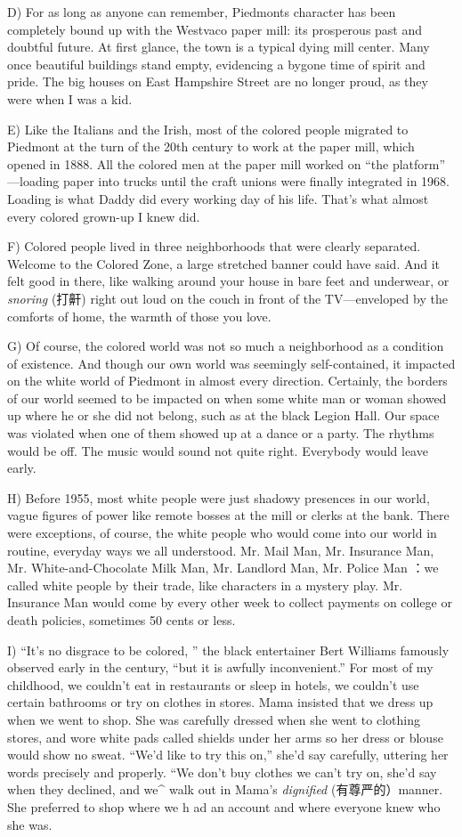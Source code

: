 \documentclass[UTF8,11pt]{ctexart}
\begin{document}
D) For as long as anyone can remember, Piedmonts character has been completely bound up with the Westvaco paper mill: its prosperous past and doubtful future. At first glance, the town is a typical dying mill center. Many once beautiful buildings stand empty, evidencing a bygone time of spirit and pride. The big houses on East Hampshire Street are no longer proud, as they were when I was a kid.


E) Like the Italians and the Irish, most of the colored people migrated to Piedmont at the turn of the 20th century to work at the paper mill, which opened in 1888. All the colored men at the paper mill worked on “the platform” —loading paper into trucks until the craft unions were finally integrated in 1968. Loading is what Daddy did every working day of his life. That’s what almost every colored grown-up I knew did.


F) Colored people lived in three neighborhoods that were clearly separated. Welcome to the Colored Zone, a large stretched banner could have said. And it felt good in there, like walking around your house in bare feet and underwear, or\textit{ snoring} (打鼾) right out loud on the couch in front of the TV—enveloped by the comforts of home, the warmth of those you love.


G) Of course, the colored world was not so much a neighborhood as a condition of existence. And though our own world was seemingly self-contained, it impacted on the white world of Piedmont in almost every direction. Certainly, the borders of our world seemed to be impacted on when some white man or woman showed up where he or she did not belong, such as at the black Legion Hall. Our space was violated when one of them showed up at a dance or a party. The rhythms would be off. The music would sound not quite right. Everybody would leave early.


H) Before 1955, most white people were just shadowy presences in our world, vague figures of power like remote bosses at the mill or clerks at the bank. There were exceptions, of course, the white people who would come into our world in routine, everyday ways we all understood. Mr. Mail Man, Mr. Insurance Man, Mr. White-and-Chocolate Milk Man, Mr. Landlord Man, Mr. Police Man ：we called white people by their trade, like characters in a mystery play. Mr. Insurance Man would come by every other week to collect payments on college or death policies, sometimes 50 cents or less.


I) “It’s no disgrace to be colored, ” the black entertainer Bert Williams famously observed early in the century, “but it is awfully inconvenient.” For most of my childhood, we couldn’t eat in restaurants or sleep in hotels, we couldn’t use certain bathrooms or try on clothes in stores. Mama insisted that we dress up when we went to shop. She was carefully dressed when she went to clothing stores, and wore white pads called shields under her arms so her dress or blouse would show no sweat. “We’d like to try this on,” she’d say carefully, uttering her words precisely and properly. “We don’t buy clothes we can’t try on, she’d say when they declined, and we\textasciicircum{} walk out in Mama’s\textit{ dignified} (有尊严的）manner. She preferred to shop where we h ad an account and where everyone knew who she was.
\end{document}
